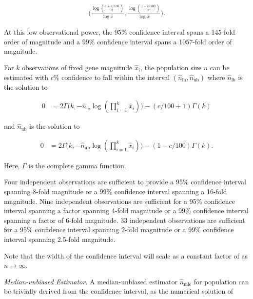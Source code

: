 \begin{footnotesize}
\begin{align*}
\Big(
\frac{\log(\frac{1+c/100}{2})}{\log\hat{x}},
\frac{\log(\frac{1-c/100}{2})}{\log\hat{x}}
\Big).
\end{align*}
\end{footnotesize}

At this low observational power, the 95\% confidence interval spans a 145-fold order of magnitude and a 99\% confidence interval spans a 1057-fold order of magnitude.

For $k$ observations of fixed gene magnitude $\hat{x}_i$, the population size $n$ can be estimated with $c\%$ confidence to fall within the interval $(\hat{n}_\mathrm{lb}, \hat{n}_\mathrm{ub})$ where $\hat{n}_\mathrm{lb}$ is the solution to

\begin{footnotesize}
\begin{align} \label{eqn:popsize_mle_ci_lb}
0
&= 2\Gamma\Big(k, -\hat{n}_\mathrm{lb}\log(\prod_{i=1}^k\hat{x}_i)\Big) - (c/100+1)\Gamma(k)
\end{align}
\end{footnotesize}

and $\hat{n}_\mathrm{ub}$ is the solution to

\begin{footnotesize}
\begin{align} \label{eqn:popsize_mle_ci_ub}
  0
  &= 2\Gamma\Big(k, -\hat{n}_\mathrm{ub}\log(\prod_{i=1}^k\hat{x}_i)\Big) - (1-c/100)\Gamma(k).
\end{align}
\end{footnotesize}

Here, $\Gamma$ is the complete gamma function.

Four independent observations are sufficient to provide a 95\% confidence interval spanning 8-fold magnitude or a 99\% confidence interval spanning a 16-fold magnitude.
Nine independent observations are sufficient for a 95\% confidence interval spanning a factor spanning 4-fold magnitude or a 99\% confidence interval spanning a factor of 6-fold magnitude.
33 independent observations are sufficient for a 95\% confidence interval spanning 2-fold magnitude or a 99\% confidence interval spanning 2.5-fold magnitude.

Note that the width of the confidence interval will scale as a constant factor of as $n \to \infty$.

\textit{Median-unbiased Estimator.}
A median-unbiased estimator $\hat{n}_\mathrm{mle}$ for population can be trivially derived from the confidence interval, as the numerical solution of

